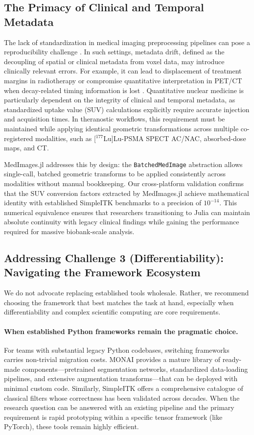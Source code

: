 \documentclass[10pt,letterpaper]{article}
\begin{document}
\subsection*{The Primacy of Clinical and Temporal Metadata}
The lack of standardization in medical imaging preprocessing pipelines can pose a reproducibility challenge \cite{Esteban_2018}. In such settings, metadata drift, defined as the decoupling of spatial or clinical metadata from voxel data, may introduce clinically relevant errors. For example, it can lead to displacement of treatment margins in radiotherapy or compromise quantitative interpretation in PET/CT when decay-related timing information is lost \cite{LowekampChen2013}. Quantitative nuclear medicine is particularly dependent on the integrity of clinical and temporal metadata, as standardized uptake value (SUV) calculations explicitly require accurate injection and acquisition times. In theranostic workflows, this requirement must be maintained while applying identical geometric transformations across multiple co-registered modalities, such as [$^{177}$Lu]Lu-PSMA SPECT AC/NAC, absorbed-dose maps, and CT.

MedImages.jl addresses this by design: the \texttt{BatchedMedImage} abstraction allows single-call, batched geometric transforms to be applied consistently across modalities without manual bookkeeping. Our cross-platform validation confirms that the SUV conversion factors extracted by MedImages.jl achieve mathematical identity with established SimpleITK benchmarks to a precision of $10^{-14}$. This numerical equivalence ensures that researchers transitioning to Julia can maintain absolute continuity with legacy clinical findings while gaining the performance required for massive biobank-scale analysis.

\subsection*{Addressing Challenge 3 (Differentiability): Navigating the Framework Ecosystem}
We do not advocate replacing established tools wholesale. Rather, we recommend choosing the framework that best matches the task at hand, especially when differentiability and complex scientific computing are core requirements.

\paragraph{When established Python frameworks remain the pragmatic choice.}
For teams with substantial legacy Python codebases, switching frameworks carries non-trivial migration costs. MONAI provides a mature library of ready-made components---pretrained segmentation networks, standardized data-loading pipelines, and extensive augmentation transforms---that can be deployed with minimal custom code. Similarly, SimpleITK offers a comprehensive catalogue of classical filters whose correctness has been validated across decades. When the research question can be answered with an existing pipeline and the primary requirement is rapid prototyping within a specific tensor framework (like PyTorch), these tools remain highly efficient.
\end{document}
